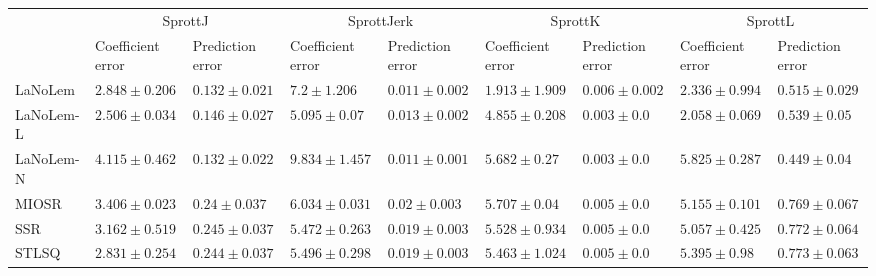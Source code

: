 \begin{table*}
{\begin{tabular}{lllllllll}
 & \multicolumn{2}{c}{SprottJ} & \multicolumn{2}{c}{SprottJerk} & \multicolumn{2}{c}{SprottK} & \multicolumn{2}{c}{SprottL} \\
 & Coefficient error & Prediction error & Coefficient error & Prediction error & Coefficient error & Prediction error & Coefficient error & Prediction error \\
\midrule
LaNoLem & $2.848\pm 0.206$ & $\mathbf{0.132}\pm 0.021$ & $7.2\pm 1.206$ & $0.011\pm 0.002$ & $\mathbf{1.913}\pm 1.909$ & $0.006\pm 0.002$ & $2.336\pm 0.994$ & $0.515\pm 0.029$ \\
LaNoLem-L & $\mathbf{2.506}\pm 0.034$ & $0.146\pm 0.027$ & $\mathbf{5.095}\pm 0.07$ & $0.013\pm 0.002$ & $4.855\pm 0.208$ & $0.003\pm 0.0$ & $\mathbf{2.058}\pm 0.069$ & $0.539\pm 0.05$ \\
LaNoLem-N & $4.115\pm 0.462$ & $0.132\pm 0.022$ & $9.834\pm 1.457$ & $\mathbf{0.011}\pm 0.001$ & $5.682\pm 0.27$ & $\mathbf{0.003}\pm 0.0$ & $5.825\pm 0.287$ & $\mathbf{0.449}\pm 0.04$ \\
MIOSR & $3.406\pm 0.023$ & $0.24\pm 0.037$ & $6.034\pm 0.031$ & $0.02\pm 0.003$ & $5.707\pm 0.04$ & $0.005\pm 0.0$ & $5.155\pm 0.101$ & $0.769\pm 0.067$ \\
SSR & $3.162\pm 0.519$ & $0.245\pm 0.037$ & $5.472\pm 0.263$ & $0.019\pm 0.003$ & $5.528\pm 0.934$ & $0.005\pm 0.0$ & $5.057\pm 0.425$ & $0.772\pm 0.064$ \\
STLSQ & $2.831\pm 0.254$ & $0.244\pm 0.037$ & $5.496\pm 0.298$ & $0.019\pm 0.003$ & $5.463\pm 1.024$ & $0.005\pm 0.0$ & $5.395\pm 0.98$ & $0.773\pm 0.063$ \\

\midrule


\end{tabular}}
\end{table*}
